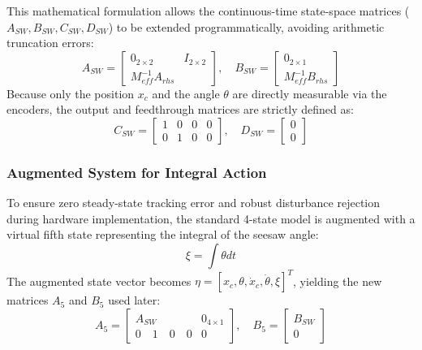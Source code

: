 \documentclass[11pt,a4paper]{article}
\begin{document}
This mathematical formulation allows the continuous-time state-space matrices ($A_{SW}, B_{SW}, C_{SW}, D_{SW}$) to be extended programmatically, avoiding arithmetic truncation errors:
\begin{equation}
A_{SW} = \begin{bmatrix} 0_{2\times2} & I_{2\times2} \\ M_{eff}^{-1}A_{rhs} \end{bmatrix}, \quad B_{SW} = \begin{bmatrix} 0_{2\times1} \\ M_{eff}^{-1}B_{rhs} \end{bmatrix}
\end{equation}
Because only the position $x_c$ and the angle $\theta$ are directly measurable via the encoders, the output and feedthrough matrices are strictly defined as:
\begin{equation}
C_{SW} = \begin{bmatrix} 1 & 0 & 0 & 0 \\ 0 & 1 & 0 & 0 \end{bmatrix}, \quad D_{SW} = \begin{bmatrix} 0 \\ 0 \end{bmatrix}
\end{equation}

\subsubsection{Augmented System for Integral Action}\label{subsub:seesaw_aug_ss}
To ensure zero steady-state tracking error and robust disturbance rejection during hardware implementation, the standard 4-state model is augmented with a virtual fifth state representing the integral of the seesaw angle:
\begin{equation}
\xi = \int \theta dt
\end{equation}
The augmented state vector becomes $\eta = [x_c, \theta, \dot{x}_c, \dot{\theta}, \xi]^T$, yielding the new matrices $A_5$ and $B_5$ used later:
\begin{equation}
A_5 = \begin{bmatrix} A_{SW} & 0_{4\times1} \\ 0 \quad 1 \quad 0 \quad 0 & 0 \end{bmatrix}, \quad B_5 = \begin{bmatrix} B_{SW} \\ 0 \end{bmatrix}
\end{equation}
\end{document}
